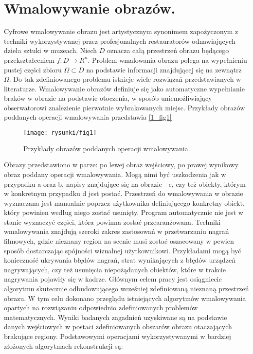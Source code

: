 \documentclass[12pt, twoside, openany]{report}
\theoremstyle{definition}
\begin{document}
\section{Wmalowywanie obrazów.}
Cyfrowe wmalowywanie obrazu jest artystycznym synonimem zapożyczonym z techniki wykorzystywanej przez profesjonalnych restauratorów odnawiających dzieła sztuki w muzeach. Niech $D$ oznacza całą przestrzeń obrazu będącego przekształceniem $f: D \rightarrow R^{n}$. Problem wmalowania obrazu polega na wypełnieniu pustej części zbioru $\Omega \subset D$ na podstawie informacji znajdującej się na zewnątrz $\Omega$. Do tak zdefiniowanego problemu istnieje wiele rozwiązań przedstawianych w literaturze. Wmalowywanie obrazów definiuje się jako automatyczne wypełnianie braków w obrazie na podstawie otoczenia, w sposób uniemożliwiający obserwatorowi znalezienie pierwotnie wybrakowanych miejsc. Przykłady obrazów poddanych operacji wmalowywania przedstawia \autoref{1_fig1} 
\begin{figure}[!h]
	\centering
	\texttt{[image: rysunki/fig1]}
	\caption{Przykłady obrazów poddanych operacji wmalowywania.}
	\label{1_fig1}
\end{figure}
\par
Obrazy przedstawiono w parze: po lewej obraz wejściowy, po prawej wynikowy obraz poddany operacji wmalowywania. Mogą nimi być uszkodzenia jak w przypadku a oraz b, napisy znajdujące się na obrazie - c, czy też obiekty, którym w konkretnym przypadku d jest postać. Przestrzeń do wmalowywania w obrazie wyznaczana jest manualnie poprzez użytkownika definiującego konkretny obiekt, który powinien według niego zostać usunięty. Program automatycznie nie jest w stanie wyznaczyć części, która powinna zostać przearanżowana. 
Techniki wmalowywania znajdują szeroki zakres zastosowań w przetwarzaniu nagrań filmowych, gdzie nieznany region na scenie musi zostać oszacowany w pewien sposób dostarczając spójności wizualnej użytkownikowi. Przykładami mogą być konieczność ukrywania błędów nagrań, strat wynikających z błędów urządzeń nagrywających, czy też usunięcia niepożądanych obiektów, które w trakcie nagrywania pojawiły się w kadrze. Głównym celem pracy jest osiągniecie algorytmu skutecznie odbudowującego wcześniej zdefiniowaną nieznaną przestrzeń obrazu. W tym celu dokonano przeglądu istniejących algorytmów wmalowywania opartych na rozwiązaniu odpowiednio zdefiniowanych problemów matematycznych. Wyniki badanych zagadnień uzyskiwane są na podstawie danych wejściowych w postaci zdefiniowanych obszarów obrazu otaczających brakujące regiony. Podstawowymi operacjami wykorzystywanymi w bardziej złożonych algorytmach rekonstrukcji są:
\end{document}
